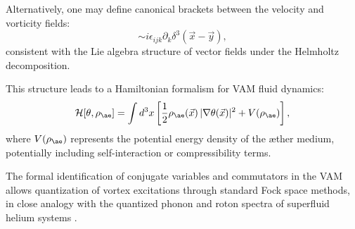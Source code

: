 Alternatively, one may define canonical brackets between the velocity and vorticity fields:
\begin{equation}
[v_i(\vec{x}), \omega_j(\vec{y})] \sim i \epsilon_{ijk} \partial_k \delta^3(\vec{x} - \vec{y}),
\end{equation}
consistent with the Lie algebra structure of vector fields under the Helmholtz decomposition.

This structure leads to a Hamiltonian formalism for VAM fluid dynamics:
\begin{equation}
\mathcal{H}[\theta, \rho_{\ae}] = \int d^3x \left[ \frac{1}{2} \rho_{\ae}(\vec{x})\, |\nabla \theta(\vec{x})|^2 + V(\rho_{\ae}) \right],
\end{equation}
where $V(\rho_{\ae})$ represents the potential energy density of the æther medium, potentially including self-interaction or compressibility terms.

The formal identification of conjugate variables and commutators in the VAM allows quantization of vortex excitations through standard Fock space methods, in close analogy with the quantized phonon and roton spectra of superfluid helium systems \cite{fetter1971nonuniform, stone2000superfluidity, verlinde2021qft}.


